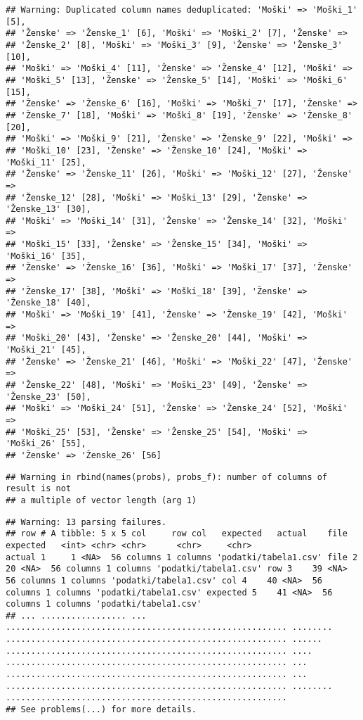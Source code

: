 \documentclass[]{article}
\begin{document}
\begin{verbatim}
## Warning: Duplicated column names deduplicated: 'Moški' => 'Moški_1' [5],
## 'Ženske' => 'Ženske_1' [6], 'Moški' => 'Moški_2' [7], 'Ženske' =>
## 'Ženske_2' [8], 'Moški' => 'Moški_3' [9], 'Ženske' => 'Ženske_3' [10],
## 'Moški' => 'Moški_4' [11], 'Ženske' => 'Ženske_4' [12], 'Moški' =>
## 'Moški_5' [13], 'Ženske' => 'Ženske_5' [14], 'Moški' => 'Moški_6' [15],
## 'Ženske' => 'Ženske_6' [16], 'Moški' => 'Moški_7' [17], 'Ženske' =>
## 'Ženske_7' [18], 'Moški' => 'Moški_8' [19], 'Ženske' => 'Ženske_8' [20],
## 'Moški' => 'Moški_9' [21], 'Ženske' => 'Ženske_9' [22], 'Moški' =>
## 'Moški_10' [23], 'Ženske' => 'Ženske_10' [24], 'Moški' => 'Moški_11' [25],
## 'Ženske' => 'Ženske_11' [26], 'Moški' => 'Moški_12' [27], 'Ženske' =>
## 'Ženske_12' [28], 'Moški' => 'Moški_13' [29], 'Ženske' => 'Ženske_13' [30],
## 'Moški' => 'Moški_14' [31], 'Ženske' => 'Ženske_14' [32], 'Moški' =>
## 'Moški_15' [33], 'Ženske' => 'Ženske_15' [34], 'Moški' => 'Moški_16' [35],
## 'Ženske' => 'Ženske_16' [36], 'Moški' => 'Moški_17' [37], 'Ženske' =>
## 'Ženske_17' [38], 'Moški' => 'Moški_18' [39], 'Ženske' => 'Ženske_18' [40],
## 'Moški' => 'Moški_19' [41], 'Ženske' => 'Ženske_19' [42], 'Moški' =>
## 'Moški_20' [43], 'Ženske' => 'Ženske_20' [44], 'Moški' => 'Moški_21' [45],
## 'Ženske' => 'Ženske_21' [46], 'Moški' => 'Moški_22' [47], 'Ženske' =>
## 'Ženske_22' [48], 'Moški' => 'Moški_23' [49], 'Ženske' => 'Ženske_23' [50],
## 'Moški' => 'Moški_24' [51], 'Ženske' => 'Ženske_24' [52], 'Moški' =>
## 'Moški_25' [53], 'Ženske' => 'Ženske_25' [54], 'Moški' => 'Moški_26' [55],
## 'Ženske' => 'Ženske_26' [56]
\end{verbatim}

\begin{verbatim}
## Warning in rbind(names(probs), probs_f): number of columns of result is not
## a multiple of vector length (arg 1)
\end{verbatim}

\begin{verbatim}
## Warning: 13 parsing failures.
## row # A tibble: 5 x 5 col     row col   expected   actual    file                  expected   <int> <chr> <chr>      <chr>     <chr>                 actual 1     1 <NA>  56 columns 1 columns 'podatki/tabela1.csv' file 2    20 <NA>  56 columns 1 columns 'podatki/tabela1.csv' row 3    39 <NA>  56 columns 1 columns 'podatki/tabela1.csv' col 4    40 <NA>  56 columns 1 columns 'podatki/tabela1.csv' expected 5    41 <NA>  56 columns 1 columns 'podatki/tabela1.csv'
## ... ................. ... ........................................................ ........ ........................................................ ...... ........................................................ .... ........................................................ ... ........................................................ ... ........................................................ ........ ........................................................
## See problems(...) for more details.
\end{verbatim}
\end{document}
